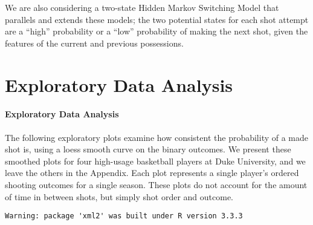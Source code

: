 \documentclass[12pt,twoside]{dukestatscithesis}
\theoremstyle{definition}
\theoremstyle{definition}
\theoremstyle{definition}
\theoremstyle{remark}
\begin{document}
We are also considering a two-state Hidden Markov Switching Model that
parallels and extends these models; the two potential states for each
shot attempt are a ``high'' probability or a ``low'' probability of
making the next shot, given the features of the current and previous
possessions.

\chapter{Exploratory Data Analysis}\label{EDA}

\subsubsection{Exploratory Data
Analysis}\label{exploratory-data-analysis}

The following exploratory plots examine how consistent the probability
of a made shot is, using a loess smooth curve on the binary outcomes. We
present these smoothed plots for four high-usage basketball players at
Duke University, and we leave the others in the Appendix. Each plot
represents a single player's ordered shooting outcomes for a single
season. These plots do not account for the amount of time in between
shots, but simply shot order and outcome.
\begin{Shaded}
\begin{Highlighting}[]
\NormalTok{(}\NormalTok{))}
\end{Highlighting}
\end{Shaded}
\begin{verbatim}
Warning: package 'xml2' was built under R version 3.3.3
\end{verbatim}
\end{document}
